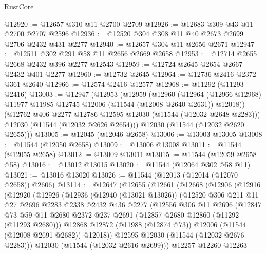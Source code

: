 \begin{lexlean}{RustCore}
\begin{coremodule}
@12920 := @12657 @310 @11 @2700 @2709
@12926 := @12683 @309 @43 @11 @2700 @2707 @2596
@12936 := @12520 @304 @308 @11 @40 @2673 @2699 @2706 @2432 @431 @2277
@12940 := @12657 @304 @11 @2656 @2671
@12947 := @12511 @302 @291 @58 @11 @2656 @2669 @2658
@12953 := @12714 @2655 @2668 @2432 @396 @2277 @12543
@12959 := @12724 @2645 @2654 @2667 @2432 @401 @2277
@12960 := @12732 @2645
@12964 := @12736 @2416 @2372 @361 @2640
@12966 := @12574 @2416 @12577
@12968 := @11292 (@11293 @2416)
@13003 := @12947
    (@12953
      (@12959
        (@12960
          (@12964 (@12966 @12968) @11977 @11985 @12745 @12006 (@11544 (@12008 @2640 @2631)) @12018))
        (@12762 @406 @2277 @12786 @12595 @12030 (@11544 (@12032 @2648 @2283)))
        @12030
        (@11544 (@12032 @2626 @2654)))
      @12030
      (@11544 (@12032 @2620 @2655)))
@13005 := @12045 (@12046 @2658)
@13006 := @13003 @13005
@13008 := @11544 (@12050 @2658)
@13009 := @13006 @13008
@13011 := @11544 (@12055 @2658)
@13012 := @13009 @13011
@13015 := @11544 (@12059 @2658 @58)
@13016 := @13012 @13015
@13020 := @11544 (@12064 @302 @58 @11)
@13021 := @13016 @13020
@13026 := @11544 (@12013 (@12014 (@12070 @2658)) @2606)
@13114 := @12647
    (@12655
      (@12661
        (@12668
          (@12906
            (@12916
              (@12920
                (@12926
                  (@12936
                    (@12940 (@13021 @13026))
                    (@12520
                      @306
                      @211
                      @11
                      @27
                      @2696
                      @2283
                      @2338
                      @2432
                      @436
                      @2277
                      (@12556
                        @306
                        @11
                        @2696
                        (@12847
                          @73
                          @59
                          @11
                          @2680
                          @2372
                          @237
                          @2691
                          (@12857 @2680 @12860 (@11292 (@11293 @2680)))
                          @12868
                          @12872
                          (@11988 (@12874 @73))
                          @12006
                          (@11544 (@12008 @2691 @2682))
                          @12018))
                      @12595
                      @12030
                      (@11544 (@12032 @2676 @2283)))
                    @12030
                    (@11544 (@12032 @2616 @2699)))
                  @12257
                  @12260
                  @12263

\end{coremodule}
\end{lexlean}
